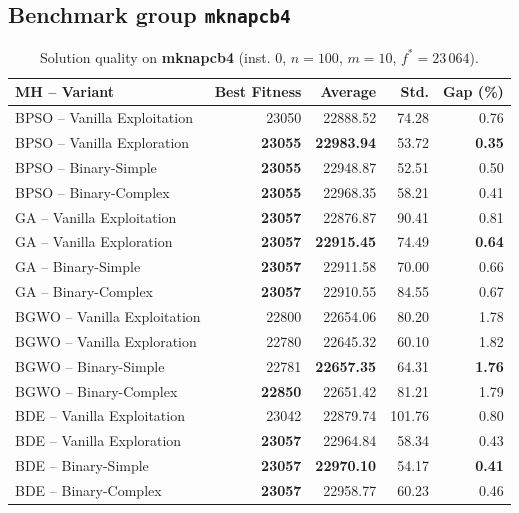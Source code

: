 \documentclass[journal,article,submit,moreauthors]{Definitions/mdpi}
\begin{document}
\clearpage
\subsection{Benchmark group \texttt{mknapcb4}}

\begin{table}[htbp]
  \centering
  \small
  \caption{Solution quality on \textbf{mknapcb4} (inst. 0, $n=100$, $m=10$, $f^*=23\,064$).}
  \label{tab:calidad_mknapcb4_0}
  \begin{tabular}{lrrrr}
    \toprule
    \textbf{MH -- Variant} &
    \textbf{Best Fitness} &
    \textbf{Average} &
    \textbf{Std.} &
    \textbf{Gap (\%)} \\
    \midrule
    BPSO -- Vanilla Exploitation &          23050 &         22888.52 &  74.28 &         0.76 \\
    BPSO -- Vanilla Exploration  & \textbf{23055} & \textbf{22983.94} &  53.72 & \textbf{0.35} \\
    BPSO -- Binary-Simple        & \textbf{23055} &         22948.87 &  52.51 &         0.50 \\
    BPSO -- Binary-Complex       & \textbf{23055} &         22968.35 &  58.21 &         0.41 \\
    \midrule
    GA -- Vanilla Exploitation   & \textbf{23057} &         22876.87 &  90.41 &         0.81 \\
    GA -- Vanilla Exploration    & \textbf{23057} & \textbf{22915.45} &  74.49 & \textbf{0.64} \\
    GA -- Binary-Simple          & \textbf{23057} &         22911.58 &  70.00 &         0.66 \\
    GA -- Binary-Complex         & \textbf{23057} &         22910.55 &  84.55 &         0.67 \\
    \midrule
    BGWO -- Vanilla Exploitation &          22800 &         22654.06 &  80.20 &         1.78 \\
    BGWO -- Vanilla Exploration  &          22780 &         22645.32 &  60.10 &         1.82 \\
    BGWO -- Binary-Simple        &          22781 & \textbf{22657.35} &  64.31 & \textbf{1.76} \\
    BGWO -- Binary-Complex       & \textbf{22850} &         22651.42 &  81.21 &         1.79 \\
    \midrule
    BDE -- Vanilla Exploitation  &          23042 &         22879.74 & 101.76 &         0.80 \\
    BDE -- Vanilla Exploration   & \textbf{23057} &         22964.84 &  58.34 &         0.43 \\
    BDE -- Binary-Simple         & \textbf{23057} & \textbf{22970.10} &  54.17 & \textbf{0.41} \\
    BDE -- Binary-Complex        & \textbf{23057} &         22958.77 &  60.23 &         0.46 \\
    \bottomrule
  \end{tabular}
\end{table}
\end{document}
